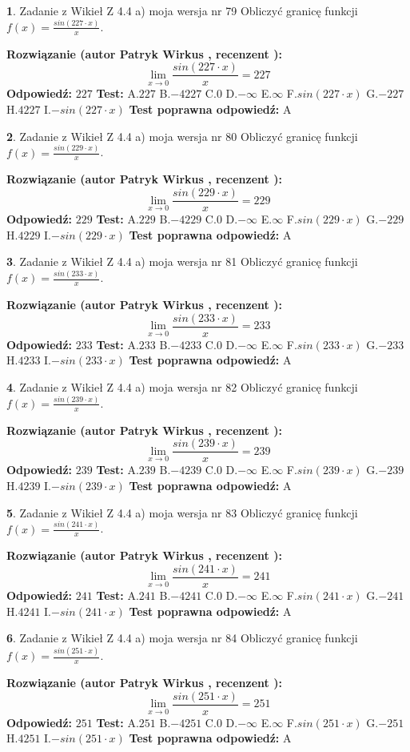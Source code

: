 \documentclass[12pt, a4paper]{article}
\theoremstyle{definition} %
\newtheorem{zad}{}
\newcommand{\zadStart}[1]{\begin{zad}#1\newline}
\newcommand{\zadStop}{\end{zad}}
\newcommand{\rozwStart}[2]{\noindent \textbf{Rozwiązanie (autor #1 , recenzent #2): }\newline}
\newcommand{\rozwStop}{\newline}
\newcommand{\odpStart}{\noindent \textbf{Odpowiedź:}\newline}
\newcommand{\odpStop}{\newline}
\newcommand{\testStart}{\noindent \textbf{Test:}\newline}
\newcommand{\testStop}{\newline}
\newcommand{\kluczStart}{\noindent \textbf{Test poprawna odpowiedź:}\newline}
\newcommand{\kluczStop}{\newline}
\begin{document}
\zadStart{Zadanie z Wikieł Z 4.4 a) moja wersja nr 79}
Obliczyć granicę funkcji $f(x)=\frac{sin(227\cdot x)}{x}$.
\zadStop
\rozwStart{Patryk Wirkus}{}
$$\lim\limits_{x\to 0}\frac{sin(227\cdot x)}{x}=
227$$
\rozwStop
\odpStart
$227$
\odpStop
\testStart
A.$227$
B.$-4227$
C.$0$
D.$-\infty$
E.$\infty$
F.$sin(227\cdot x)$
G.$-227$
H.$4227$
I.$-sin(227\cdot x)$
\testStop
\kluczStart
A
\kluczStop



\zadStart{Zadanie z Wikieł Z 4.4 a) moja wersja nr 80}
Obliczyć granicę funkcji $f(x)=\frac{sin(229\cdot x)}{x}$.
\zadStop
\rozwStart{Patryk Wirkus}{}
$$\lim\limits_{x\to 0}\frac{sin(229\cdot x)}{x}=
229$$
\rozwStop
\odpStart
$229$
\odpStop
\testStart
A.$229$
B.$-4229$
C.$0$
D.$-\infty$
E.$\infty$
F.$sin(229\cdot x)$
G.$-229$
H.$4229$
I.$-sin(229\cdot x)$
\testStop
\kluczStart
A
\kluczStop



\zadStart{Zadanie z Wikieł Z 4.4 a) moja wersja nr 81}
Obliczyć granicę funkcji $f(x)=\frac{sin(233\cdot x)}{x}$.
\zadStop
\rozwStart{Patryk Wirkus}{}
$$\lim\limits_{x\to 0}\frac{sin(233\cdot x)}{x}=
233$$
\rozwStop
\odpStart
$233$
\odpStop
\testStart
A.$233$
B.$-4233$
C.$0$
D.$-\infty$
E.$\infty$
F.$sin(233\cdot x)$
G.$-233$
H.$4233$
I.$-sin(233\cdot x)$
\testStop
\kluczStart
A
\kluczStop



\zadStart{Zadanie z Wikieł Z 4.4 a) moja wersja nr 82}
Obliczyć granicę funkcji $f(x)=\frac{sin(239\cdot x)}{x}$.
\zadStop
\rozwStart{Patryk Wirkus}{}
$$\lim\limits_{x\to 0}\frac{sin(239\cdot x)}{x}=
239$$
\rozwStop
\odpStart
$239$
\odpStop
\testStart
A.$239$
B.$-4239$
C.$0$
D.$-\infty$
E.$\infty$
F.$sin(239\cdot x)$
G.$-239$
H.$4239$
I.$-sin(239\cdot x)$
\testStop
\kluczStart
A
\kluczStop



\zadStart{Zadanie z Wikieł Z 4.4 a) moja wersja nr 83}
Obliczyć granicę funkcji $f(x)=\frac{sin(241\cdot x)}{x}$.
\zadStop
\rozwStart{Patryk Wirkus}{}
$$\lim\limits_{x\to 0}\frac{sin(241\cdot x)}{x}=
241$$
\rozwStop
\odpStart
$241$
\odpStop
\testStart
A.$241$
B.$-4241$
C.$0$
D.$-\infty$
E.$\infty$
F.$sin(241\cdot x)$
G.$-241$
H.$4241$
I.$-sin(241\cdot x)$
\testStop
\kluczStart
A
\kluczStop



\zadStart{Zadanie z Wikieł Z 4.4 a) moja wersja nr 84}
Obliczyć granicę funkcji $f(x)=\frac{sin(251\cdot x)}{x}$.
\zadStop
\rozwStart{Patryk Wirkus}{}
$$\lim\limits_{x\to 0}\frac{sin(251\cdot x)}{x}=
251$$
\rozwStop
\odpStart
$251$
\odpStop
\testStart
A.$251$
B.$-4251$
C.$0$
D.$-\infty$
E.$\infty$
F.$sin(251\cdot x)$
G.$-251$
H.$4251$
I.$-sin(251\cdot x)$
\testStop
\kluczStart
A
\kluczStop
\end{document}
